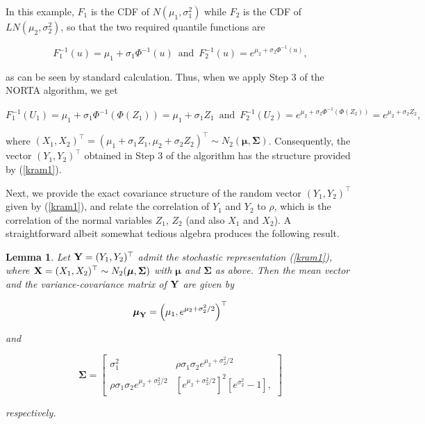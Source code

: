 \documentclass[
]{jss}
\newtheorem{lemma}[theorem]{Lemma}
\begin{document}
In this example, \(F_1\) is the CDF of \(N(\mu_1, \sigma_1^2)\) while \(F_2\) is the CDF of \(LN(\mu_2, \sigma_2^2)\), so that the two required quantile functions are

\begin{equation}
F_1^{-1}(u) = \mu_1+\sigma_1 \Phi^{-1}(u)\,\,\, \mbox{and} \,\,\, F_2^{-1}(u) = e^{\mu_2+\sigma_2 \Phi^{-1}(u)}, 
\label{eq:kram4}
\end{equation}

as can be seen by standard calculation. Thus, when we apply Step 3 of the NORTA algorithm, we get

\begin{equation}
F_1^{-1}(U_1) = \mu_1+\sigma_1 \Phi^{-1}(\Phi(Z_1)) =  \mu_1+\sigma_1 Z_1 \,\,\, \mbox{and} \,\,\, F_2^{-1}(U_2) = e^{\mu_2+\sigma_2 \Phi^{-1}(\Phi(Z_2))} = e^{\mu_2+\sigma_2 Z_2}, 
\label{eq:kram5}
\end{equation}

where \((X_1, X_2)^\top = (\mu_1+\sigma_1 Z_1, \mu_2+\sigma_2 Z_2)^\top \sim N_2(\boldsymbol \mu, \boldsymbol \Sigma)\). Consequently, the vector \((Y_1, Y_2)^\top\) obtained in Step 3 of the algorithm has the structure provided by (\ref{kram1}).

\vspace{0.1in}

\noindent Next, we provide the exact covariance structure of the random vector \((Y_1, Y_2)^\top\) given by (\ref{kram1}), and relate the correlation of \(Y_1\) and \(Y_2\) to \(\rho\), which is the correlation of the normal variables \(Z_1\), \(Z_2\) (and also \(X_1\) and \(X_2\)). A straightforward albeit somewhat tedious algebra produces the following result.

\begin{lemma}
Let ${\bf Y} = (Y_1, Y_2)^\top$ admit the stochastic representation (\ref{kram1}), where ${\bf X} = (X_1, X_2)^\top \sim N_2(\boldsymbol \mu, \boldsymbol \Sigma)$ with $\boldsymbol \mu$ and $\boldsymbol \Sigma$ as above. Then the mean vector and the variance-covariance matrix of ${\bf Y}$ are given by 

\begin{equation}
\boldsymbol \mu_{{\bf Y}} = \left(\mu_1, e^{\mu_2+\sigma_2^2/2}\right)^\top
\label{eq:kram6}
\end{equation}

and 

\begin{equation}
\boldsymbol \Sigma = 
\begin{bmatrix}
\sigma_1^2 & \rho \sigma_1\sigma_2  e^{\mu_2+\sigma_2^2/2}  \\
\rho \sigma_1\sigma_2 e^{\mu_2+\sigma_2^2/2} & \left[ e^{\mu_2+\sigma_2^2/2}\right]^2 \left[e^{\sigma_2^2} -1 \right],
\end{bmatrix}
\label{eq:kram7}
\end{equation}

respectively. 
\end{lemma}
\end{document}
